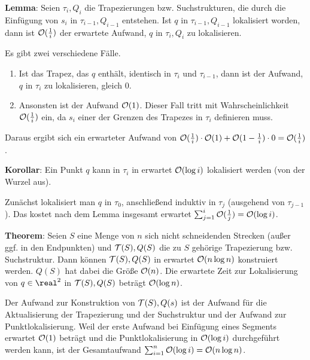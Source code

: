\linie

\textbf{Lemma}:
Seien $\tau_i, Q_i$ die Trapezierungen bzw. Suchstrukturen, die durch die Einfügung von
$s_i$ in $\tau_{i-1}, Q_{i-1}$ entstehen.
Ist $q$ in $\tau_{i-1}, Q_{i-1}$ lokalisiert worden,
dann ist $\mathcal{O}(\frac{1}{i})$ der erwartete Aufwand,
$q$ in $\tau_i, Q_i$ zu lokalisieren.

\begin{Beweis}
    Es gibt zwei verschiedene Fälle.
    \begin{enumerate}
        \item
        Ist das Trapez, das $q$ enthält, identisch in $\tau_i$ und $\tau_{i-1}$,
        dann ist der Aufwand, $q$ in $\tau_i$ zu lokalisieren, gleich $0$.
        
        \item
        Ansonsten ist der Aufwand $\mathcal{O}(1)$.
        Dieser Fall tritt mit Wahrscheinlichkeit $\mathcal{O}(\frac{1}{i})$ ein, da $s_i$
        einer der Grenzen des Trapezes in $\tau_i$ definieren muss.
    \end{enumerate}
    Daraus ergibt sich ein erwarteter Aufwand von
    $\mathcal{O}(\frac{1}{i}) \cdot \mathcal{O}(1) + \mathcal{O}(1 - \frac{1}{i}) \cdot 0 = \mathcal{O}(\frac{1}{i})$.
\end{Beweis}

\textbf{Korollar}:
Ein Punkt $q$ kann in $\tau_i$ in erwartet $\mathcal{O}(\log i)$ lokalisiert werden
(von der Wurzel aus).

\begin{Beweis}
    Zunächst lokalisiert man $q$ in $\tau_0$,
    anschließend induktiv in $\tau_j$ (ausgehend von $\tau_{j-1}$).
    Das kostet nach dem Lemma insgesamt erwartet $\sum_{j=1}^i \mathcal{O}(\frac{1}{j}) = \mathcal{O}(\log i)$.
\end{Beweis}

\textbf{Theorem}:
Seien $S$ eine Menge von $n$ sich nicht schneidenden Strecken
(außer ggf. in den Endpunkten) und $\mathcal{T}(S), Q(S)$ die
zu $S$ gehörige Trapezierung bzw. Suchstruktur.
Dann können $\mathcal{T}(S), Q(S)$ in erwartet $\mathcal{O}(n \log n)$ konstruiert werden.
$Q(S)$ hat dabei die Größe $\mathcal{O}(n)$.
Die erwartete Zeit zur Lokalisierung von $q \in \real^2$ in $\mathcal{T}(S), Q(S)$ beträgt $\mathcal{O}(\log n)$.

\begin{Beweis}
    Der Aufwand zur Konstruktion von $\mathcal{T}(S), Q(s)$ ist der Aufwand für die Aktualisierung der
    Trapezierung und der Suchstruktur und der Aufwand zur Punktlokalisierung.
    Weil der erste Aufwand bei Einfügung eines Segments erwartet $\mathcal{O}(1)$ beträgt und
    die Punktlokalisierung in $\mathcal{O}(\log i)$ durchgeführt werden kann,
    ist der Gesamtaufwand $\sum_{i=1}^n \mathcal{O}(\log i) = \mathcal{O}(n \log n)$.
\end{Beweis}

